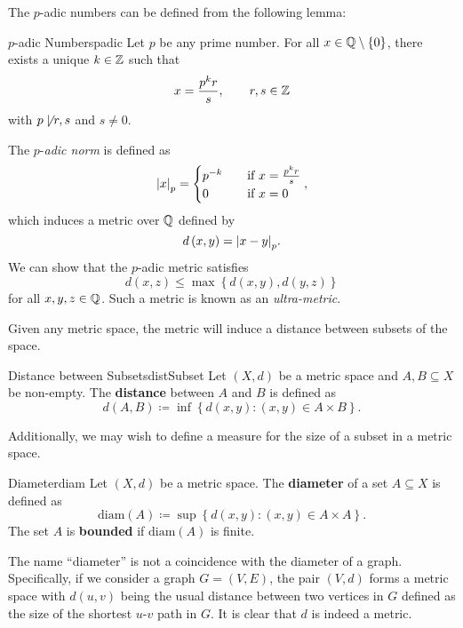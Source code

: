 \documentclass[math]{amznotes}
\theoremstyle{remark}
\begin{document}
The $p$-adic numbers can be defined from the following lemma:
\begin{lembox}{$p$-adic Numbers}{padic}
    Let $p$ be any prime number. For all $x \in \mathbb{Q} \setminus \left\{0\right\}$, there exists a unique $k \in \mathbb{Z}$ such that
    \begin{equation*}
        x = \frac{p^kr}{s}, \qquad r, s \in \mathbb{Z}
    \end{equation*}
    with $p \not\mid r, s$ and $s \neq 0$.
\end{lembox}
The $p$-\textit{adic norm} is defined as 
\begin{equation*}
    {\left\lvert {x} \right\rvert}_p = \begin{cases}
        p^{-k} & \quad\textrm{if } x = \frac{p^kr}{s} \\
        0 & \quad\textrm{if } x = 0
    \end{cases},
\end{equation*}
which induces a metric over $\mathbb{Q}$ defined by 
\begin{equation*}
    d\left(x, y\right) ={\left\lvert {x - y} \right\rvert}_p.
\end{equation*}
We can show that the $p$-adic metric satisfies 
\begin{equation*}
    d\left(x, z\right) \leq \max\left\{d\left(x, y\right), d\left(y, z\right)\right\}
\end{equation*}
for all $x, y, z \in \mathbb{Q}$. Such a metric is known as an \textit{ultra-metric}.

Given any metric space, the metric will induce a distance between subsets of the space.
\begin{dfnbox}{Distance between Subsets}{distSubset}
    Let $\left(X, d\right)$ be a metric space and $A, B \subseteq X$ be non-empty. The {\color{red} \textbf{distance}} between $A$ and $B$ is defined as 
    \begin{equation*}
        d\left(A, B\right) \coloneqq \inf \left\{d\left(x, y\right) \colon \left(x, y\right) \in A \times B\right\}.
    \end{equation*}
\end{dfnbox}
Additionally, we may wish to define a measure for the size of a subset in a metric space.
\begin{dfnbox}{Diameter}{diam}
    Let $\left(X, d\right)$ be a metric space. The {\color{red} \textbf{diameter}} of a set $A \subseteq X$ is defined as 
    \begin{equation*}
        \mathrm{diam}\left(A\right) \coloneqq \sup\left\{d\left(x, y\right) \colon \left(x, y\right) \in A \times A\right\}.
    \end{equation*}
    The set $A$ is {\color{red} \textbf{bounded}} if $\mathrm{diam}\left(A\right)$ is finite.
\end{dfnbox}
The name ``diameter'' is not a coincidence with the diameter of a graph. Specifically, if we consider a graph $G = \left(V, E\right)$, the pair $\left(V, d\right)$ forms a metric space with $d\left(u, v\right)$ being the usual distance between two vertices in $G$ defined as the size of the shortest $u$-$v$ path in $G$. It is clear that $d$ is indeed a metric.
\end{document}
